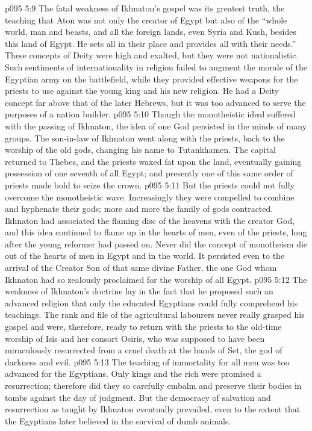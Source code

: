 \vs p095 5:9 The fatal weakness of Ikhnaton’s gospel was its greatest truth, the teaching that Aton was not only the creator of Egypt but also of the “whole world, man and beasts, and all the foreign lands, even Syria and Kush, besides this land of Egypt. He sets all in their place and provides all with their needs.” These concepts of Deity were high and exalted, but they were not nationalistic. Such sentiments of internationality in religion failed to augment the morale of the Egyptian army on the battlefield, while they provided effective weapons for the priests to use against the young king and his new religion. He had a Deity concept far above that of the later Hebrews, but it was too advanced to serve the purposes of a nation builder.
\vs p095 5:10 \pc Though the monotheistic ideal suffered with the passing of Ikhnaton, the idea of one God persisted in the minds of many groups. The son\hyp{}in\hyp{}law of Ikhnaton went along with the priests, back to the worship of the old gods, changing his name to Tutankhamen. The capital returned to Thebes, and the priests waxed fat upon the land, eventually gaining possession of one seventh of all Egypt; and presently one of this same order of priests made bold to seize the crown.
\vs p095 5:11 But the priests could not fully overcome the monotheistic wave. Increasingly they were compelled to combine and hyphenate their gods; more and more the family of gods contracted. Ikhnaton had associated the flaming disc of the heavens with the creator God, and this idea continued to flame up in the hearts of men, even of the priests, long after the young reformer had passed on. Never did the concept of monotheism die out of the hearts of men in Egypt and in the world. It persisted even to the arrival of the Creator Son of that same divine Father, the one God whom Ikhnaton had so zealously proclaimed for the worship of all Egypt.
\vs p095 5:12 The weakness of Ikhnaton’s doctrine lay in the fact that he proposed such an advanced religion that only the educated Egyptians could fully comprehend his teachings. The rank and file of the agricultural labourers never really grasped his gospel and were, therefore, ready to return with the priests to the old\hyp{}time worship of Isis and her consort Osiris, who was supposed to have been miraculously resurrected from a cruel death at the hands of Set, the god of darkness and evil.
\vs p095 5:13 The teaching of immortality for all men was too advanced for the Egyptians. Only kings and the rich were promised a resurrection; therefore did they so carefully embalm and preserve their bodies in tombs against the day of judgment. But the democracy of salvation and resurrection as taught by Ikhnaton eventually prevailed, even to the extent that the Egyptians later believed in the survival of dumb animals.
